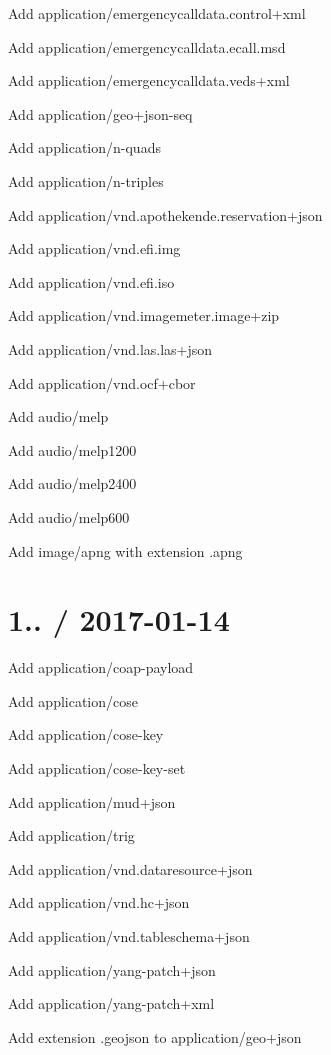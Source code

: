 
\begin{DoxyItemize}
\item Add {\ttfamily application/emergencycalldata.\+control+xml}
\item Add {\ttfamily application/emergencycalldata.\+ecall.\+msd}
\item Add {\ttfamily application/emergencycalldata.\+veds+xml}
\item Add {\ttfamily application/geo+json-\/seq}
\item Add {\ttfamily application/n-\/quads}
\item Add {\ttfamily application/n-\/triples}
\item Add {\ttfamily application/vnd.\+apothekende.\+reservation+json}
\item Add {\ttfamily application/vnd.\+efi.\+img}
\item Add {\ttfamily application/vnd.\+efi.\+iso}
\item Add {\ttfamily application/vnd.\+imagemeter.\+image+zip}
\item Add {\ttfamily application/vnd.\+las.\+las+json}
\item Add {\ttfamily application/vnd.\+ocf+cbor}
\item Add {\ttfamily audio/melp}
\item Add {\ttfamily audio/melp1200}
\item Add {\ttfamily audio/melp2400}
\item Add {\ttfamily audio/melp600}
\item Add {\ttfamily image/apng} with extension {\ttfamily .apng}
\end{DoxyItemize}

\section*{1.. / 2017-\/01-\/14 }


\begin{DoxyItemize}
\item Add {\ttfamily application/coap-\/payload}
\item Add {\ttfamily application/cose}
\item Add {\ttfamily application/cose-\/key}
\item Add {\ttfamily application/cose-\/key-\/set}
\item Add {\ttfamily application/mud+json}
\item Add {\ttfamily application/trig}
\item Add {\ttfamily application/vnd.\+dataresource+json}
\item Add {\ttfamily application/vnd.\+hc+json}
\item Add {\ttfamily application/vnd.\+tableschema+json}
\item Add {\ttfamily application/yang-\/patch+json}
\item Add {\ttfamily application/yang-\/patch+xml}
\item Add extension {\ttfamily .geojson} to {\ttfamily application/geo+json}
\end{DoxyItemize}

